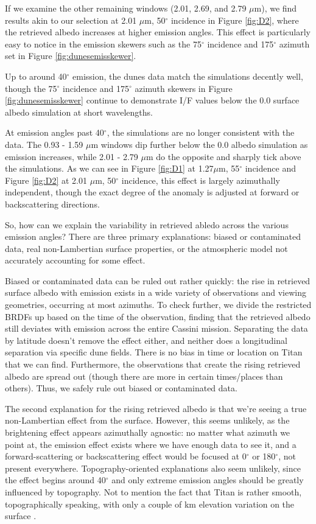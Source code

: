 \documentclass[twocolumn,linenumbers]{aastex631}
\begin{document}
If we examine the other remaining windows (2.01, 2.69, and 2.79 $\mu$m), we find results akin to our selection at 2.01 $\mu$m, 50$^{\circ}$ incidence in Figure \ref{fig:D2}, where the retrieved albedo increases at higher emission angles. This effect is particularly easy to notice in the emission skewers such as the 75$^{\circ}$ incidence and 175$^{\circ}$ azimuth set in Figure \ref{fig:dunesemisskewer}.

Up to around 40$^{\circ}$ emission, the dunes data match the simulations decently well, though the 75$^{\circ}$ incidence and 175$^{\circ}$ azimuth skewers in Figure \ref{fig:dunesemisskewer} continue to demonstrate I/F values below the 0.0 surface albedo simulation at short wavelengths.

At emission angles past 40$^{\circ}$, the simulations are no longer consistent with the data. The 0.93 - 1.59 $\mu$m windows dip further below the 0.0 albedo simulation as emission increases, while 2.01 - 2.79 $\mu$m do the opposite and sharply tick above the simulations. As we can see in Figure \ref{fig:D1} at 1.27$\mu$m, 55$^{\circ}$ incidence and Figure \ref{fig:D2} at 2.01 $\mu$m, 50$^{\circ}$ incidence, this effect is largely azimuthally independent, though the exact degree of the anomaly is adjusted at forward or backscattering directions.

So, how can we explain the variability in retrieved abledo across the various emission angles? There are three primary explanations: biased or contaminated data, real non-Lambertian surface properties, or the atmospheric model not accurately accounting for some effect.

Biased or contaminated data can be ruled out rather quickly: the rise in retrieved surface albedo with emission exists in a wide variety of observations and viewing geometries, occurring at most azimuths. To check further, we divide the restricted BRDFs up based on the time of the observation, finding that the retrieved albedo still deviates with emission across the entire Cassini mission. Separating the data by latitude doesn't remove the effect either, and neither does a longitudinal separation via specific dune fields. There is no bias in time or location on Titan that we can find. Furthermore, the observations that create the rising retrieved albedo are spread out (though there are more in certain times/places than others). Thus, we safely rule out biased or contaminated data.

The second explanation for the rising retrieved albedo is that we're seeing a true non-Lambertian effect from the surface. However, this seems unlikely, as the brightening effect appears azimuthally agnostic: no matter what azimuth we point at, the emission effect exists where we have enough data to see it, and a forward-scattering or backscattering effect would be focused at 0$^{\circ}$ or 180$^{\circ}$, not present everywhere. Topography-oriented explanations also seem unlikely, since the effect begins around 40$^{\circ}$ and only extreme emission angles should be greatly influenced by topography. Not to mention the fact that Titan is rather smooth, topographically speaking, with only a couple of km elevation variation on the surface \citep{Corlies2017}.
\end{document}
